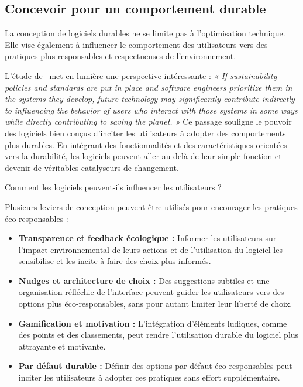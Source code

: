 \subsection{Concevoir pour un comportement durable}
La conception de logiciels durables ne se limite pas à l'optimisation technique. Elle vise également à influencer le comportement des utilisateurs vers des pratiques plus responsables et respectueuses de l'environnement.


L'étude de~\cite{SafetySecuritySustainability} met en lumière une perspective intéressante : \emph{« If sustainability policies and standards are put in place and software engineers prioritize them in the systems they develop, future technology may significantly contribute indirectly to influencing the behavior of users who interact with those systems in some ways while directly contributing to saving the planet. »} Ce passage souligne le pouvoir des logiciels bien conçus d'inciter les utilisateurs à adopter des comportements plus durables. En intégrant des fonctionnalités et des caractéristiques orientées vers la durabilité, les logiciels peuvent aller au-delà de leur simple fonction et devenir de véritables catalyseurs de changement.


Comment les logiciels peuvent-ils influencer les utilisateurs ?


Plusieurs leviers de conception peuvent être utilisés pour encourager les pratiques éco-responsables :

\begin{itemize}
    \item \textbf{Transparence et feedback écologique :} Informer les utilisateurs sur l'impact environnemental de leurs actions et de l'utilisation du logiciel les sensibilise et les incite à faire des choix plus informés.
    \item \textbf{Nudges et architecture de choix :} Des suggestions subtiles et une organisation réfléchie de l'interface peuvent guider les utilisateurs vers des options plus éco-responsables, sans pour autant limiter leur liberté de choix.
    \item \textbf{Gamification et motivation :} L'intégration d'éléments ludiques, comme des points et des classements, peut rendre l'utilisation durable du logiciel plus attrayante et motivante.
    \item \textbf{Par défaut durable :} Définir des options par défaut éco-responsables peut inciter les utilisateurs à adopter ces pratiques sans effort supplémentaire.
\end{itemize}


